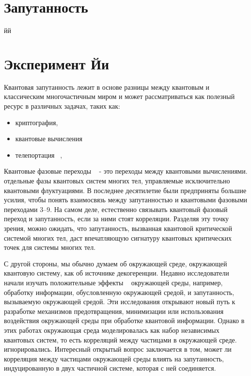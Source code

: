 \documentclass[11pt]{article}
\begin{document}
\section{Запутанность}
йй

\section{Эксперимент Йи}
Квантовая запутанность лежит в основе разницы между квантовым и классическим многочастичным миром и может рассматриваться как полезный ресурс в различных задачах, таких как:
\begin{itemize} 
	\item криптография, 
	\item квантовые вычисления
	\item телепортация ~\cite{b1}, 
\end{itemize} 

Квантовые фазовые переходы ~\cite{2} - это переходы между квантовыми вычислениями. отдельные фазы квантовых систем многих тел, управляемые исключительно квантовыми флуктуациями. В последнее десятилетие были предприняты большие усилия, чтобы понять взаимосвязь между запутанностью и квантовыми фазовыми переходами 3–9. На самом деле, естественно связывать квантовый фазовый переход и запутанность, если за ними стоят корреляции. Разделяя эту точку зрения, можно ожидать, что запутанность, вызванная квантовой критической системой многих тел, даст впечатляющую сигнатуру квантовых критических точек для системы многих тел.

С другой стороны, мы обычно думаем об окружающей среде, окружающей квантовую систему, как об источнике декогеренции. Недавно исследователи начали изучать положительные эффекты ~\cite{b10,b11,b12,b13,b14,b15,b16,b17} окружающей среды, например, обработку информации, обусловленную окружающей средой, и запутанность, вызываемую окружающей средой. Эти исследования открывают новый путь к разработке механизмов предотвращения, минимизации или использования воздействия окружающей среды при обработке квантовой информации. Однако в этих работах окружающая среда моделировалась как набор независимых квантовых систем, то есть корреляций между частицами в окружающей среде. игнорировались. Интересный открытый вопрос заключается в том, может ли корреляция между частицами окружающей среды влиять на запутанность, индуцированную в двух частичной системе, которая с ней соединяется.
\end{document}
